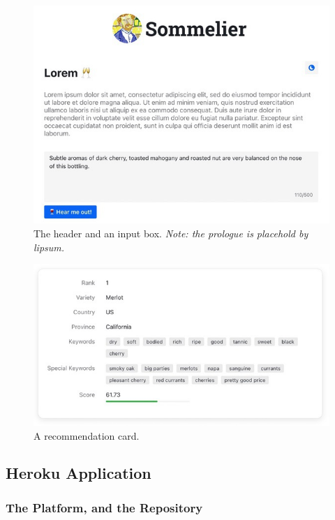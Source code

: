 \documentclass[
	a4paper,
	fontsize=10pt, %
	twoside=false, %
	secnumdepth=2, %
]{kaohandt}
\begin{document}
\begin{figure}[h]
	\includegraphics[]{sommelier-view-03.jpg}
	\caption{The header and an input box. \emph{Note: the prologue is placehold by lipsum.}}
	\label{fig:app_input}
\end{figure}

\begin{figure}[h]
	\includegraphics[]{sommelier-view-04.jpg}
	\caption{A recommendation card.}
	\label{fig:app_rec_card}
\end{figure}

\subsection{Heroku Application}

\subsubsection*{The Platform, and the Repository}
\end{document}
